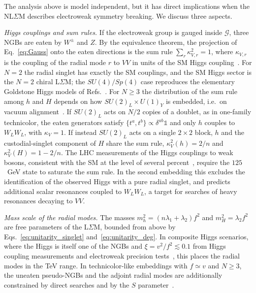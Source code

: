 \documentclass[aps,prd,twocolumn,superscriptaddress,nofootinbib,floatfix]{revtex4-2}
\theoremstyle{remark}
\newcommand{\G}{\mathcal{G}}
\newcommand{\ie}{i.e.}
\begin{document}
The analysis above is model independent, but it has direct implications when the NL$\Sigma$M describes electroweak symmetry breaking. We discuss three aspects.

\emph{Higgs couplings and sum rules.} If the electroweak group is gauged inside $\G$, three NGBs are eaten by $W^\pm$ and $Z$. By the equivalence theorem, the projection of Eq.~\eqref{eq:Gauss} onto the eaten directions is the sum rule $\sum_r\kappa_{V,r}^2=1$, where $\kappa_{V,r}$ is the coupling of the radial mode $r$ to $VV$ in units of the SM Higgs coupling~\cite{Gunion:1990kf,Falkowski:2012vh}. For $N=2$ the radial singlet has exactly the SM couplings, and the SM Higgs sector is the $N=2$ chiral L$\Sigma$M; the $SU(4)/Sp(4)$ case reproduces the elementary Goldstone Higgs models of Refs.~\cite{Alanne:2014kea,Gertov:2015xma,Cacciapaglia:2014uja}. For $N\ge3$ the distribution of the sum rule among $h$ and $H$ depends on how $SU(2)_L\times U(1)_Y$ is embedded, \ie\ on vacuum alignment~\cite{Peskin:1980gc,Preskill:1980mz}. If $SU(2)_L$ acts on $N/2$ copies of a doublet, as in one-family technicolor, the eaten generators satisfy $\{t^a,t^b\}\propto\delta^{ab}\mathbb{1}$ and only $h$ couples to $W_LW_L$, with $\kappa_V=1$. If instead $SU(2)_L$ acts on a single $2\times2$ block, $h$ and the custodial-singlet component of $H$ share the sum rule, $\kappa_V^2(h)=2/n$ and $\kappa_V^2(H)=1-2/n$. The LHC measurements of the Higgs couplings to weak bosons, consistent with the SM at the level of several percent~\cite{ATLAS:2022vkf,CMS:2022dwd,ParticleDataGroup:2024cfk}, require the $125$~GeV state to saturate the sum rule. In the second embedding this excludes the identification of the observed Higgs with a pure radial singlet, and predicts additional scalar resonances coupled to $W_LW_L$, a target for searches of heavy resonances decaying to $VV$.

\emph{Mass scale of the radial modes.} The masses $m_h^2=(n\lambda_1+\lambda_2)f^2$ and $m_H^2=\lambda_2f^2$ are free parameters of the L$\Sigma$M, bounded from above by Eqs.~\eqref{eq:unitarity_singlet} and~\eqref{eq:unitarity_deg}. In composite Higgs scenarios, where the Higgs is itself one of the NGBs and $\xi=v^2/f^2\lesssim0.1$ from Higgs coupling measurements and electroweak precision tests~\cite{Peskin:1991sw,ParticleDataGroup:2024cfk,Contino:2010rs,Panico:2015jxa}, this places the radial modes in the TeV range. In technicolor-like embeddings with $f\simeq v$ and $N\geq3$, the uneaten pseudo-NGBs and the adjoint radial modes are additionally constrained by direct searches and by the $S$ parameter~\cite{Peskin:1991sw}.
\end{document}
